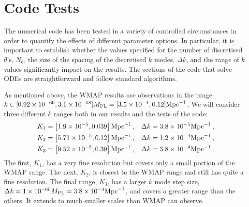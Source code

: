 \section{Code Tests}
\label{sec:tests-num}


The numerical code has been tested in a variety of controlled
circumstances in order to quantify the effects of different parameter options. In
particular, it is important to establish whether the values
specified for the number of discretised $\theta$'s, $N_\theta$, the size
of the
spacing of the discretised $k$ modes, $\Delta k$, and the range of
$k$ values significantly impact on the results. The sections
of the code that solve ODEs are straightforward and follow standard algorithms.


As mentioned above, the WMAP results \cite{Komatsu:2008hk} use
observations in the range $k\in [0.92 \times 10^{-60}, 3.1 \times
  10^{-58}]M_{\mathrm{PL}} = [3.5\times 10^{-4}, 0.12] \mathrm{Mpc}^{-1}$. We will
consider three different $k$ ranges both in our results and the tests
of the code\footnotemark:
%
\begin{align}
\label{eq:Krangedefns}
K_1 &= \left[1.9\times 10^{-5}, 0.039\right]\mathrm{Mpc}^{-1}\,, &\Delta k = 3.8\times 10^{-5}\mathrm{Mpc}^{-1}
\,,\nonumber\\
K_2 &= \left[5.71\times 10^{-5}, 0.12\right]\mathrm{Mpc}^{-1}\,, &\Delta k =
1.2\times 10^{-4}\mathrm{Mpc}^{-1}\,,
\nonumber\\ 
K_3 &= \left[9.52\times 10^{-5}, 0.39\right]\mathrm{Mpc}^{-1}\,, &\Delta k = 3.8\times 10^{-4}\mathrm{Mpc}^{-1}
\,.
\end{align}
% 
% 
The first, $K_1$, has a very fine resolution but covers only a small portion of the WMAP range. 
The next, $K_2$, is closest to the WMAP range and still has quite a fine resolution. 
The final
range, $K_3$, has a larger $k$ mode step size, $\Delta k = 1\times 10^{-60}M_{\mathrm{PL}} =
3.8\times 10^{-4}\mathrm{Mpc}^{-1}$, and
covers a greater range than the others. It extends to much smaller scales than WMAP can observe.

